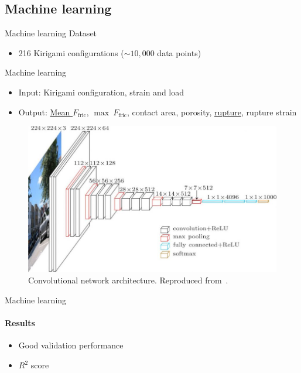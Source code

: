 \documentclass[
	10pt, %
]{beamer}
\begin{document}
\subsection{Machine learning}
\begin{frame}{Machine learning}
	Dataset
	\begin{itemize}
		\item 216 Kirigami configurations ($\sim 10,000$ data points)
	\end{itemize}
	\vspace*{5mm}
	Machine learning
	\begin{itemize}
		\item Input: Kirigami configuration, strain and load
		\item Output: \underline{Mean $F_{\text{fric}}$}, $\max \ F_{\text{fric}}$, contact area, porosity, \underline{rupture}, rupture strain
	\end{itemize}

	\begin{figure}[H]
		\centering
		\includegraphics[width=0.5\linewidth]{../thesis/figures/ML/VGGNet16.jpg}
		\caption{Convolutional network architecture. Reproduced from~\cite{VGGNet_16_image}.}
	\end{figure}
\end{frame}
%
%
%
%
\begin{frame}{Machine learning}
	\framesubtitle{Results}
	\begin{itemize}
		\item Good validation performance 
		\item $R^2$ score
	\end{itemize}
\end{frame}
%
%
\end{document}
